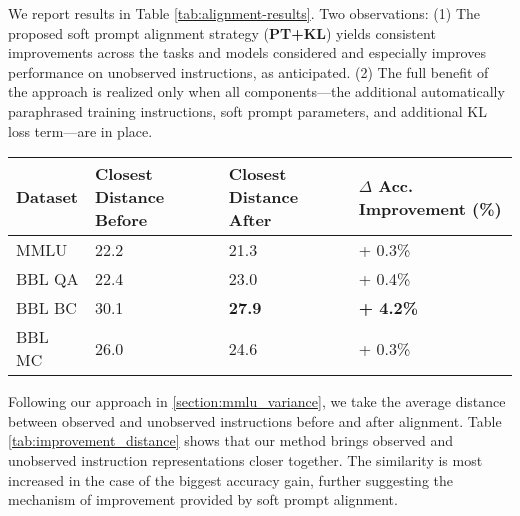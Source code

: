 We report results in Table \ref{tab:alignment-results}.
Two observations: (1) The proposed soft prompt alignment strategy ({\bf PT+KL}) yields consistent improvements across the tasks and models considered and especially improves performance on unobserved instructions, as anticipated. (2) The full benefit of the approach is realized only when all components---the additional automatically paraphrased training instructions, soft prompt parameters, and additional KL loss term---are in place.

\begin{table*}[h]
  \small
  \centering
  \begin{tabular}{l l l l}
    \toprule
    \textbf{Dataset} & \textbf{Closest Distance Before} & \textbf{Closest Distance After} & \textbf{$\Delta$ Acc. Improvement} (\%) \\
    \midrule
    \textsc{MMLU}    & 22.2                             & 21.3                            & + 0.3\%                                 \\
    \midrule
    \textsc{BBL QA}  & 22.4                             & 23.0                            & + 0.4\%                                 \\
    \textsc{BBL BC}  & 30.1                             & \textbf{27.9}                   & \textbf{+ 4.2\%}                        \\
    \textsc{BBL MC}  & 26.0                             & 24.6                            & + 0.3\%                                 \\
    \bottomrule
  \end{tabular}
  \caption{Average distances before and after soft prompt alignment with Flan-T5-XL.} %
  \vspace{-0.5em}
  \label{tab:improvement_distance}
\end{table*}


Following our approach in \ref{section:mmlu_variance}, we take the average distance between observed and unobserved instructions before and after alignment.
Table \ref{tab:improvement_distance} shows that our method brings observed and unobserved instruction representations closer together.
The similarity is most increased in the case of the biggest accuracy gain, further suggesting the mechanism of improvement provided by soft prompt alignment.


